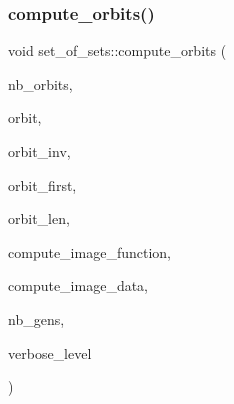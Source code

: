 \subsubsection{\texorpdfstring{compute\+\_\+orbits()}{compute\_orbits()}}
{\footnotesize\ttfamily void set\+\_\+of\+\_\+sets\+::compute\+\_\+orbits (\begin{DoxyParamCaption}\item[{\mbox{\hyperlink{galois_8h_a09fddde158a3a20bd2dcadb609de11dc}{I\+NT}} \&}]{nb\+\_\+orbits,  }\item[{\mbox{\hyperlink{galois_8h_a09fddde158a3a20bd2dcadb609de11dc}{I\+NT}} $\ast$\&}]{orbit,  }\item[{\mbox{\hyperlink{galois_8h_a09fddde158a3a20bd2dcadb609de11dc}{I\+NT}} $\ast$\&}]{orbit\+\_\+inv,  }\item[{\mbox{\hyperlink{galois_8h_a09fddde158a3a20bd2dcadb609de11dc}{I\+NT}} $\ast$\&}]{orbit\+\_\+first,  }\item[{\mbox{\hyperlink{galois_8h_a09fddde158a3a20bd2dcadb609de11dc}{I\+NT}} $\ast$\&}]{orbit\+\_\+len,  }\item[{void($\ast$)(\mbox{\hyperlink{classset__of__sets}{set\+\_\+of\+\_\+sets}} $\ast$\mbox{\hyperlink{simeon_8_c_adab47f8243f1b5a2c31df2535d6b37d0}{S}}, void $\ast$compute\+\_\+image\+\_\+data, \mbox{\hyperlink{galois_8h_a09fddde158a3a20bd2dcadb609de11dc}{I\+NT}} elt\+\_\+idx, \mbox{\hyperlink{galois_8h_a09fddde158a3a20bd2dcadb609de11dc}{I\+NT}} gen\+\_\+idx, \mbox{\hyperlink{galois_8h_a09fddde158a3a20bd2dcadb609de11dc}{I\+NT}} \&idx\+\_\+of\+\_\+image, \mbox{\hyperlink{galois_8h_a09fddde158a3a20bd2dcadb609de11dc}{I\+NT}} \mbox{\hyperlink{simeon_8_c_a818073fbcc2f439e7c56952f67386122}{verbose\+\_\+level}})}]{compute\+\_\+image\+\_\+function,  }\item[{void $\ast$}]{compute\+\_\+image\+\_\+data,  }\item[{\mbox{\hyperlink{galois_8h_a09fddde158a3a20bd2dcadb609de11dc}{I\+NT}}}]{nb\+\_\+gens,  }\item[{\mbox{\hyperlink{galois_8h_a09fddde158a3a20bd2dcadb609de11dc}{I\+NT}}}]{verbose\+\_\+level }\end{DoxyParamCaption})}

\mbox{\label{classset__of__sets_a9d585c2d3505ece51cbf917c4da9cd98}} 
